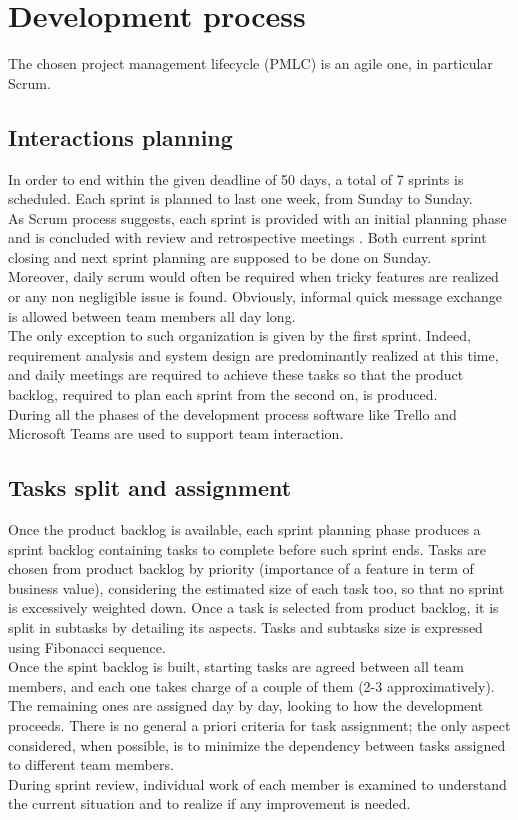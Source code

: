 \chapter{Development process}

The chosen project management lifecycle (PMLC) is an agile one, in particular Scrum. 
\section{Interactions planning}

In order to end within the given deadline of 50 days, a total of 7 sprints is scheduled. Each sprint is planned to last one week, from Sunday to Sunday.
\\
As Scrum process suggests, each sprint is provided with an initial planning phase and is concluded with review and retrospective meetings . Both current sprint closing and next sprint planning are supposed to be done on Sunday.
\\
Moreover, daily scrum would often be required when tricky features are realized or any non negligible issue is found. Obviously, informal quick message exchange is allowed between team members all day long.
\\
The only exception to such organization is given by the first sprint. Indeed, requirement analysis and system design are predominantly realized at this time, and daily meetings are required to achieve these tasks so that the product backlog, required to plan each sprint from the second on, is produced.
\\
During all the phases of the development process software like Trello and Microsoft Teams are used to support team interaction.


\section{Tasks split and assignment}

Once the product backlog is available, each sprint planning phase produces a sprint backlog containing tasks to complete before such sprint ends. Tasks are chosen from product backlog by priority (importance of a feature in term of business value), considering the estimated size of each task too, so that no sprint is excessively weighted down. Once a task is selected from product backlog, it is split in subtasks by detailing its aspects. Tasks and subtasks size is expressed using Fibonacci sequence. 
\\
Once the spint backlog is built, starting tasks are agreed between all team members, and each one takes charge of a couple of them (2-3 approximatively). The remaining ones are assigned day by day, looking to how the development proceeds. There is no general a priori criteria for task assignment; the only aspect considered, when possible, is to minimize the dependency between tasks assigned to different team members. 
\\
During sprint review, individual work of each member is examined to understand the current situation and to realize if any improvement is needed.

